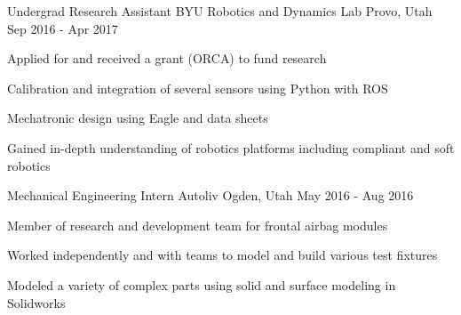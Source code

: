 \begin{cventries}
  \cventry
    {Undergrad Research Assistant} %
    {BYU Robotics and Dynamics Lab} %
    {Provo, Utah} %
    {Sep 2016 - Apr 2017} %
    {
      \begin{cvitems} %
        \item {Applied for and received a grant (ORCA) to fund research}
        \item {Calibration and integration of several sensors using Python with ROS}
        \item {Mechatronic design using Eagle and data sheets}
        \item {Gained in-depth understanding of robotics platforms including compliant and soft robotics}
      \end{cvitems}
    }


  \cventry
    {Mechanical Engineering Intern} %
    {Autoliv} %
    {Ogden, Utah} %
    {May 2016 - Aug 2016} %
    {
      \begin{cvitems} %
        \item {Member of research and development team for frontal airbag modules}
        \item {Worked independently and with teams to model and build various test fixtures}
        \item {Modeled a variety of complex parts using solid and surface modeling in Solidworks}
      \end{cvitems}
    }


\end{cventries}
